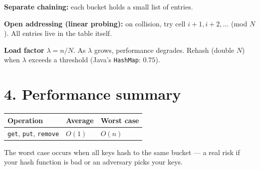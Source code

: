 \documentclass[11pt]{article}
\begin{document}
\textbf{Separate chaining:} each bucket holds a small list of entries.
\begin{center}
\end{center}

\textbf{Open addressing (linear probing):} on collision, try cell $i+1, i+2, \ldots$ (mod $N$). All entries live in the table itself.

\textbf{Load factor} $\lambda = n/N$. As $\lambda$ grows, performance degrades. Rehash (double $N$) when $\lambda$ exceeds a threshold (Java's \texttt{HashMap}: $0.75$).

\section*{4. Performance summary}

\begin{center}
\begin{tabular}{lll}
\textbf{Operation} & \textbf{Average} & \textbf{Worst case} \\
\hline
\texttt{get}, \texttt{put}, \texttt{remove} & $O(1)$ & $O(n)$ \\
\end{tabular}
\end{center}

The worst case occurs when all keys hash to the same bucket --- a real risk if your hash function is bad or an adversary picks your keys.
\end{document}
